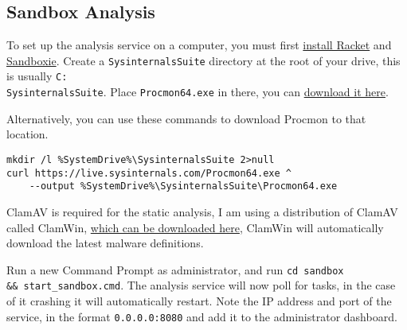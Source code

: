 \begin{appendices}
\section{Sandbox Analysis}
To set up the analysis service on a computer, you must first
\href{https://download.racket-lang.org/}{install Racket} and
\href{https://sandboxie-plus.com/}{Sandboxie}.
Create a \texttt{SysinternalsSuite} directory at the root of your drive, this is usually \texttt{C:\\SysinternalsSuite}.
Place \texttt{Procmon64.exe} in there, you can
\href{https://learn.microsoft.com/en-us/sysinternals/downloads/procmon}{download it here}.

Alternatively, you can use these commands to download Procmon to that location.
\begin{lstlisting}
mkdir /l %SystemDrive%\SysinternalsSuite 2>null
curl https://live.sysinternals.com/Procmon64.exe ^
    --output %SystemDrive%\SysinternalsSuite\Procmon64.exe
\end{lstlisting}

ClamAV is required for the static analysis,
I am using a distribution of ClamAV called ClamWin,
\href{https://clamwin.com/content/view/18/46/}{which can be downloaded here},
ClamWin will automatically download the latest malware definitions.

Run a new Command Prompt as administrator, and run \texttt{cd sandbox \\
\&\& start\_sandbox.cmd}.
The analysis service will now poll for tasks, in the case of it crashing it will automatically restart.
Note the IP address and port of the service,
in the format \texttt{0.0.0.0:8080}
and add it to the administrator dashboard.

\end{appendices}
